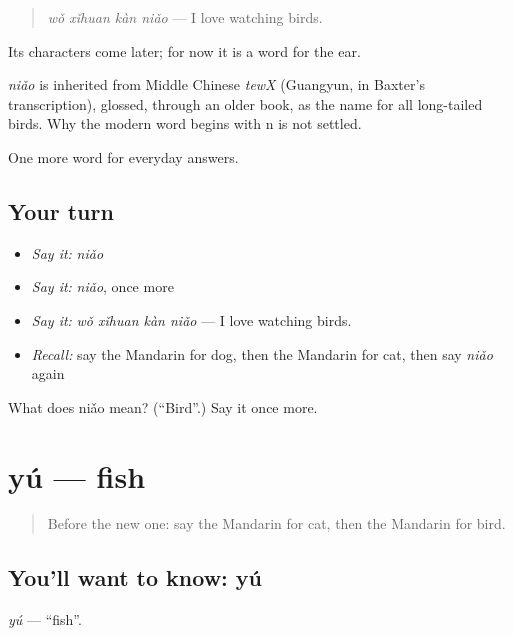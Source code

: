 \begin{quote}
\emph{wǒ xǐhuan kàn niǎo} — I love watching birds.
\end{quote}

Its characters come later; for now it is a word for the ear.

\begin{cousinweb}
\emph{niǎo} is inherited from Middle Chinese \emph{tewX} (Guangyun, in Baxter's transcription), glossed, through an older book, as the name for all long-tailed birds. Why the modern word begins with n is not settled.
\end{cousinweb}

\begin{grammarlens}[title={What you've built}]
One more word for everyday answers.
\end{grammarlens}

\subsection*{Your turn}
\begin{itemize}
\raggedright
  \item \emph{Say it:} \emph{niǎo}
  \item \emph{Say it:} \emph{niǎo}, once more
  \item \emph{Say it:} \emph{wǒ xǐhuan kàn niǎo} — I love watching birds.
  \item \emph{Recall:} say the Mandarin for dog, then the Mandarin for cat, then say \emph{niǎo} again
\end{itemize}

\begin{tcolorbox}[breakable,colback=teal!4,colframe=teal!35!black,title={Before you move on}]
What does niǎo mean? (\textquotedblleft{}Bird\textquotedblright{}.) Say it once more.
\end{tcolorbox}
\section[yú]{yú — fish}

\label{lesson:ZH-C67-yu}



\begin{quote}
Before the new one: say the Mandarin for cat, then the Mandarin for bird.
\end{quote}

\subsection*{You'll want to know: yú}
\emph{yú} — \textquotedblleft{}fish\textquotedblright{}.


